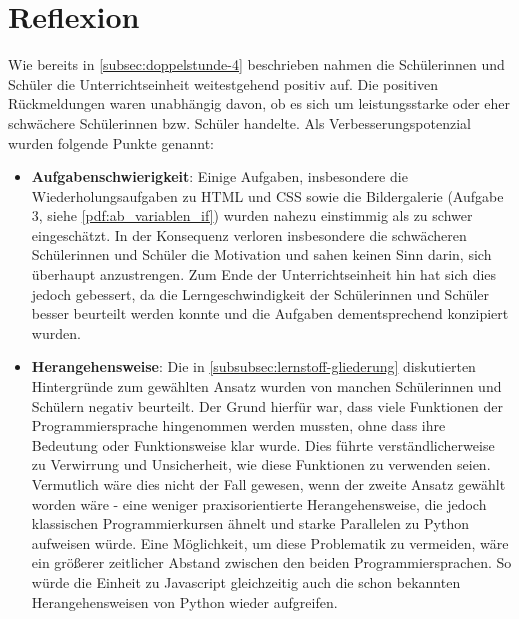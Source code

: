 \section{Reflexion}

Wie bereits in \autoref{subsec:doppelstunde-4} beschrieben nahmen die Schülerinnen und Schüler die Unterrichtseinheit weitestgehend positiv auf.
Die positiven Rückmeldungen waren unabhängig davon, ob es sich um leistungsstarke oder eher schwächere Schülerinnen bzw. Schüler handelte.
Als Verbesserungspotenzial wurden folgende Punkte genannt:

\begin{itemize}
	\item \textbf{Aufgabenschwierigkeit}: Einige Aufgaben, insbesondere die Wiederholungsaufgaben zu HTML und CSS sowie die Bildergalerie (Aufgabe 3, siehe \autoref{pdf:ab_variablen_if}) wurden nahezu einstimmig als zu schwer eingeschätzt.
	In der Konsequenz verloren insbesondere die schwächeren Schülerinnen und Schüler die Motivation und sahen keinen Sinn darin, sich überhaupt anzustrengen.
	Zum Ende der Unterrichtseinheit hin hat sich dies jedoch gebessert, da die Lerngeschwindigkeit der Schülerinnen und Schüler besser beurteilt werden konnte und die Aufgaben dementsprechend konzipiert wurden.

	\item \textbf{Herangehensweise}: Die in \autoref{subsubsec:lernstoff-gliederung} diskutierten Hintergründe zum gewählten Ansatz wurden von manchen Schülerinnen und Schülern negativ beurteilt.
	Der Grund hierfür war, dass viele Funktionen der Programmiersprache hingenommen werden mussten, ohne dass ihre Bedeutung oder Funktionsweise klar wurde.
	Dies führte verständlicherweise zu Verwirrung und Unsicherheit, wie diese Funktionen zu verwenden seien.
	Vermutlich wäre dies nicht der Fall gewesen, wenn der zweite Ansatz gewählt worden wäre - eine weniger praxisorientierte Herangehensweise, die jedoch klassischen Programmierkursen ähnelt und starke Parallelen zu Python aufweisen würde.
	Eine Möglichkeit, um diese Problematik zu vermeiden, wäre ein größerer zeitlicher Abstand zwischen den beiden Programmiersprachen.
	So würde die Einheit zu Javascript gleichzeitig auch die schon bekannten Herangehensweisen von Python wieder aufgreifen.
\end{itemize}

